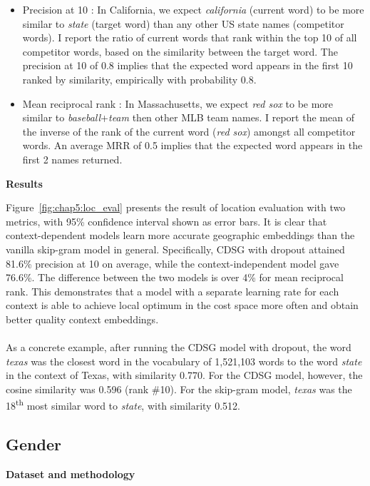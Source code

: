 \documentclass[a4paper,12pt,twoside,openright]{report}
\newcommand{\tb}{\vspace{10pt} \textbf}
\newcommand{\ti}{\textit}
\newcommand{\nl}{\\ \\}
\begin{document}
\begin{itemize}
	\item Precision at 10 : In California, we expect \ti{california} (current word) to be more similar to \ti{state} (target word) than any other US state names (competitor words). I report the ratio of current words that rank within the top 10 of all competitor words, based on the similarity between the target word. The precision at 10 of 0.8 implies that the expected word appears in the first 10 ranked by similarity, empirically with probability 0.8.
	\item Mean reciprocal rank : In Massachusetts, we expect \ti{red sox} to be more similar to \ti{baseball}+\ti{team} then other MLB team names. I report the mean of the inverse of the rank of the current word (\ti{red sox}) amongst all competitor words. An average MRR of 0.5 implies that the expected word appears in the first 2 names returned.
\end{itemize}

\tb{Results}

Figure~\ref{fig:chap5:loc_eval} presents the result of location evaluation with two metrics, with 95\% confidence interval shown as error bars. It is clear that context-dependent models learn more accurate geographic embeddings than the vanilla skip-gram model in general. Specifically, CDSG with dropout attained 81.6\% precision at 10 on average, while the context-independent model gave 76.6\%. The difference between the two models is over 4\% for mean reciprocal rank. This demonstrates that a model with a separate learning rate for each context is able to achieve local optimum in the cost space more often and obtain better quality context embeddings.
\nl
As a concrete example, after running the CDSG model with dropout, the word \ti{texas} was the closest word in the vocabulary of 1,521,103 words to the word \ti{state} in the context of Texas, with similarity 0.770. For the CDSG model, however, the cosine similarity was 0.596 (rank \#10). For the skip-gram model, \ti{texas} was the 18\textsuperscript{th} most similar word to \ti{state}, with similarity 0.512.

\subsection{Gender}

\tb{Dataset and methodology}
\end{document}
